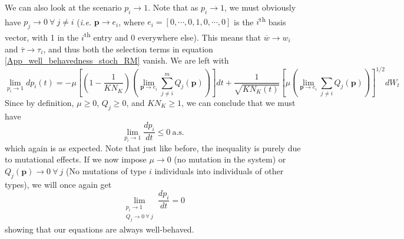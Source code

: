 We can also look at the scenario $p_i \to 1$. Note that as $p_i \to 1$, we must obviously have $p_j \to 0 \ \forall \ j \neq i$ (\emph{i.e.} $\mathbf{p} \to e_i$, where $e_i = [0,\cdots,0,1,0,\cdots,0]$ is the $i$\textsuperscript{th} basis vector, with 1 in the $i$\textsuperscript{th} entry and 0 everywhere else). This means that $\overline{w} \to w_i$ and $\overline{\tau} \to \tau_i$, and thus both the selection terms in equation \eqref{App_well_behavedness_stoch_RM} vanish. We are left with
\begin{equation*}
		\lim\limits_{p_i \to 1} dp_i(t) = -\mu\left[\left(1 - \frac{1}{KN_K}\right)\left(\lim\limits_{\mathbf{p} \to e_i}\sum\limits_{j\neq i}^{m}Q_j(\mathbf{p})\right)\right]dt
		+ \frac{1}{\sqrt{KN_{K}(t)}}\left[\mu\left(\lim\limits_{\mathbf{p} \to e_i} \sum\limits_{j\neq i}Q_j(\mathbf{p})\right)\right]^{1/2}dW_t
\end{equation*}
Since by definition, $\mu \geq 0$, $Q_j \geq 0$, and  $KN_K \geq 1$, we can conclude that we must have
\begin{equation*}
	\lim\limits_{p_i \to 1} \frac{dp_i}{dt} \leq 0 \ \textrm{a.s.}
\end{equation*}
which again is as expected. Note that just like before, the inequality is purely due to mutational effects. If we now impose $\mu \to 0$ (no mutation in the system) or $Q_j(\mathbf{p}) \to 0 \ \forall \ j$ (No mutations of type $i$ individuals into individuals of other types), we will once again get
\begin{equation*}
	\lim_{\substack{p_i \to 1 \\ Q_j \to 0 \ \forall \ j}} \frac{dp_i}{dt} = 0
\end{equation*}
showing that our equations are always well-behaved.